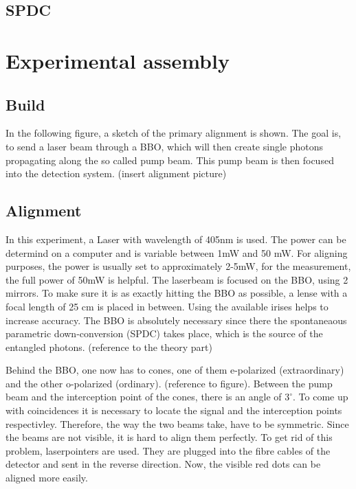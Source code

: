 \documentclass[12pt,a4paper]{article}
\begin{document}
\begin{multicols}{2}
\subsection{SPDC}
\label{SPDC}




\section{Experimental assembly}

\subsection{Build}
In the following figure, a sketch of the primary alignment is shown. The goal is, to send a laser beam through a BBO, which will then create single photons propagating along the so called pump beam. This pump beam is then focused into the detection system.
(insert alignment picture)

\subsection{Alignment}

In this experiment, a Laser with wavelength of 405nm is used. The power can be determind on a computer and is variable between 1mW and 50 mW. For aligning purposes, the power is usually set to approximately 2-5mW, for the measurement, the full power of 50mW is helpful. 
The laserbeam is  focused on the BBO, using 2 mirrors. To make sure it is as exactly hitting the BBO as possible, a lense with a focal length of 25 cm is placed in between. Using the available irises helps to increase accuracy. The BBO is absolutely necessary since there the spontaneaous parametric down-conversion (SPDC) takes place, which is the source of the entangled photons. (reference to the theory part)

 Behind the BBO, one now has to cones, one of them e-polarized (extraordinary) and the other o-polarized (ordinary). (reference to figure). Between the pump beam and the interception point of the cones, there is an angle of $3^\circ$. To come up with coincidences it is  necessary to locate the signal and the interception points respectivley. Therefore, the way the two beams take, have to be symmetric. Since the beams are not visible, it is hard to align them perfectly. To get rid of this problem, laserpointers are used. They are plugged into the fibre cables of the detector and sent in the reverse direction. Now, the visible red dots can be aligned more easily.
 

\end{multicols}
\end{document}
